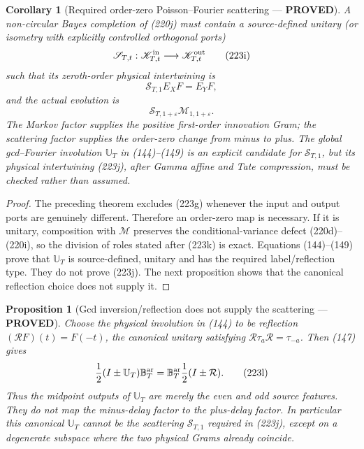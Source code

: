 \documentclass[11pt]{article}
\newtheorem{proposition}[theorem]{Proposition}
\newtheorem{corollary}[theorem]{Corollary}
\newcommand{\PROVED}{\textcolor{green!45!black}{\textbf{PROVED}}}
\begin{document}
\begin{corollary}[Required order-zero Poisson--Fourier scattering ---
\PROVED]
A non-circular Bayes completion of (220j) must contain a source-defined
unitary (or isometry with explicitly controlled orthogonal ports)
\begin{equation}
 \mathscr S_{T,t}:\mathscr K_{T,t}^{\rm in}
          \longrightarrow\mathscr K_{T,t}^{\rm out} \tag{223i}
\end{equation}
such that its zeroth-order physical intertwining is
\begin{equation}
 \mathscr S_{T,1}E_XF=E_YF,                           \tag{223j}
\end{equation}
and the actual evolution is
\begin{equation}
 \mathscr S_{T,1+\varepsilon}\mathcal M_{1,1+\varepsilon}. \tag{223k}
\end{equation}
The Markov factor supplies the positive first-order innovation Gram; the
scattering factor supplies the order-zero change from minus to plus.  The
global gcd--Fourier involution $\mathbb U_T$ in (144)--(149) is an explicit
candidate for $\mathscr S_{T,1}$, but its physical intertwining (223j), after
Gamma affine and Tate compression, must be checked rather than assumed.
\end{corollary}

\begin{proof}
The preceding theorem excludes (223g) whenever the input and output ports
are genuinely different.  Therefore an order-zero map is necessary.  If it
is unitary, composition with $\mathcal M$ preserves the conditional-variance
defect (220d)--(220i), so the division of roles stated after (223k) is exact.
Equations (144)--(149) prove that $\mathbb U_T$ is source-defined, unitary and
has the required label/reflection type.  They do not prove (223j).  The next
proposition shows that the canonical reflection choice does not supply it.
\end{proof}

\begin{proposition}[Gcd inversion/reflection does not supply the scattering
--- \PROVED]
Choose the physical involution in (144) to be reflection
$(\mathcal RF)(t)=F(-t)$, the canonical unitary satisfying
$\mathcal R\tau_a\mathcal R=\tau_{-a}$.  Then (147) gives
\begin{equation}
 \frac12(I\pm\mathbb U_T)\mathbb B_T^{\rm ar}
 =\mathbb B_T^{\rm ar}\frac12(I\pm\mathcal R).       \tag{223l}
\end{equation}
Thus the midpoint outputs of $\mathbb U_T$ are merely the even and odd
source features.  They do not map the minus-delay factor to the plus-delay
factor.  In particular this canonical $\mathbb U_T$ cannot be the scattering
$\mathscr S_{T,1}$ required in (223j), except on a degenerate subspace where
the two physical Grams already coincide.
\end{proposition}
\end{document}
